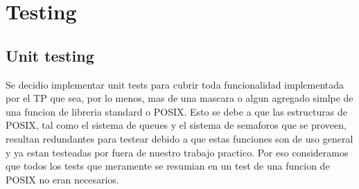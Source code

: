 \documentclass[10pt,a4paper]{report}
\begin{document}
\chapter{Testing}
\section{Unit testing}
Se decidio implementar unit tests para cubrir toda funcionalidad implementada por el TP que sea, por lo menos, mas de una mascara o algun agregado simlpe de una funcion de libreria standard o POSIX. 
Esto se debe a que las estructuras de POSIX, tal como el sistema de queues y el sistema de semaforos que se proveen, resultan redundantes para testear debido a que estas funciones son de uso general y ya estan testeadas por fuera de nuestro trabajo practico. Por eso consideramos que todos los tests que meramente se resumian en un test de una funcion de POSIX no eran necesarios.
\end{document}

